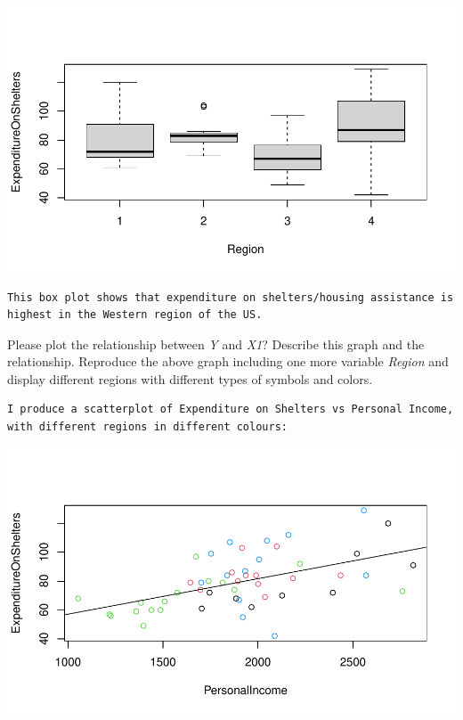 \documentclass[12pt,letterpaper]{article}
\begin{document}
\begin{itemize}

\includegraphics[width=.75\textwidth]{boxplot_regions}
\begin{verbatim}
This box plot shows that expenditure on shelters/housing assistance is
highest in the Western region of the US.
\end{verbatim}

		Please plot the relationship between \emph{Y} and \emph{X1}? Describe this graph and the relationship. Reproduce the above graph including one more variable \emph{Region} and display different regions with different types of symbols and colors.

\begin{verbatim}
I produce a scatterplot of Expenditure on Shelters vs Personal Income,
with different regions in different colours:
\end{verbatim}

 
\includegraphics[width=.75\textwidth]{scatterplot_regions_coloured}


\end{itemize}
\end{document}
